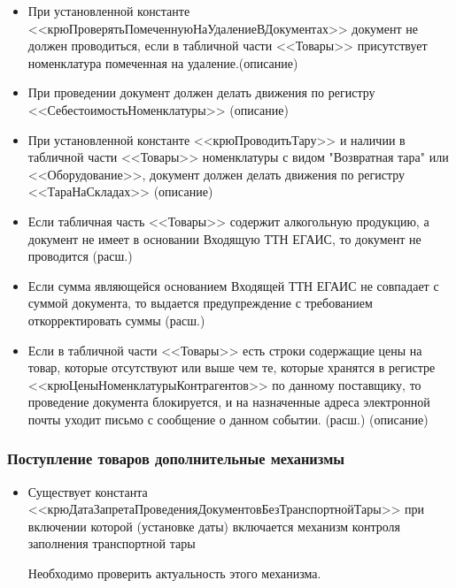 \begin{itemize}
	\item При установленной константе <<крюПроверятьПомеченнуюНаУдалениеВДокументах>>
	документ не должен проводиться, если в табличной части <<Товары>> присутствует
	номенклатура помеченная на удаление.(описание)
	\item При проведении документ должен делать движения по регистру <<СебестоимостьНоменклатуры>> (описание)
	\item При установленной константе <<крюПроводитьТару>> и наличии в табличной части <<Товары>> номенклатуры
	с видом "Возвратная тара" или <<Оборудование>>, документ должен делать движения по регистру <<ТараНаСкладах>> (описание)
	\item Если табличная часть <<Товары>> содержит алкогольную продукцию, а документ не имеет в основании Входящую ТТН ЕГАИС, то документ не проводится (расш.)
	\item Если сумма являющейся основанием Входящей ТТН ЕГАИС не совпадает с суммой документа, то выдается предупреждение с требованием откорректировать суммы (расш.)
	\item Если в табличной части <<Товары>> есть строки содержащие цены на товар, которые отсутствуют или выше чем те, которые хранятся в регистре <<крюЦеныНоменклатурыКонтрагентов>> по данному поставщику, то проведение документа блокируется, и на назначенные адреса электронной почты уходит письмо с сообщение о данном событии. (расш.)
	(описание)
\end{itemize}
\vspace{\baselineskip}\par
\subsubsection{Поступление товаров дополнительные механизмы}
\begin{itemize}
	\item Существует константа <<крюДатаЗапретаПроведенияДокументовБезТранспортнойТары>> при
	включении которой (установке даты) включается механизм контроля заполнения транспортной тары
	\begin{myquote}
     Необходимо проверить актуальность этого механизма.
	\end{myquote}


\end{itemize}



